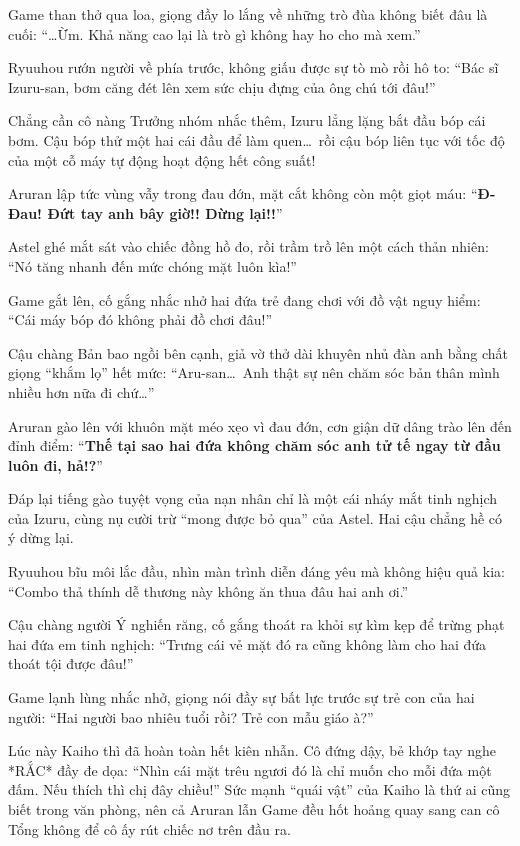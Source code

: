 \documentclass[../main.tex]{subfiles}
\begin{document}
Game than thở qua loa, giọng đầy lo lắng về những trò đùa không biết đâu là cuối: ``\dots Ừm. Khả năng cao lại là trò gì không hay ho cho mà xem.''

Ryuuhou rướn người về phía trước, không giấu được sự tò mò rồi hô to: ``Bác sĩ Izuru-san, bơm căng đét lên xem sức chịu đựng của ông chú tới đâu!''

Chẳng cần cô nàng Trưởng nhóm nhắc thêm, Izuru lẳng lặng bắt đầu bóp cái bơm. Cậu bóp thử một hai cái đầu để làm quen\dots\ rồi cậu bóp liên tục với tốc độ của một cỗ máy tự động hoạt động hết công suất!

Aruran lập tức vùng vẫy trong đau đớn, mặt cắt không còn một giọt máu: ``\textbf{Đ-Đau! Đứt tay anh bây giờ!! Dừng lại!!}''


Astel ghé mắt sát vào chiếc đồng hồ đo, rồi trầm trồ lên một cách thản nhiên: ``Nó tăng nhanh đến mức chóng mặt luôn kìa!''

Game gắt lên, cố gắng nhắc nhở hai đứa trẻ đang chơi với đồ vật nguy hiểm: ``Cái máy bóp đó không phải đồ chơi đâu!''

Cậu chàng Bản bao ngồi bên cạnh, giả vờ thở dài khuyên nhủ đàn anh bằng chất giọng ``khắm lọ'' hết mức: ``Aru-san\dots\ Anh thật sự nên chăm sóc bản thân mình nhiều hơn nữa đi chứ\dots''

Aruran gào lên với khuôn mặt méo xẹo vì đau đớn, cơn giận dữ dâng trào lên đến đỉnh điểm: ``\textbf{Thế tại sao hai đứa không chăm sóc anh tử tế ngay từ đầu luôn đi, hả!?}''

Đáp lại tiếng gào tuyệt vọng của nạn nhân chỉ là một cái nháy mắt tinh nghịch của Izuru, cùng nụ cười trừ ``mong được bỏ qua'' của Astel. Hai cậu chẳng hề có ý dừng lại.


Ryuuhou bĩu môi lắc đầu, nhìn màn trình diễn đáng yêu mà không hiệu quả kia: ``Combo thả thính dễ thương này không ăn thua đâu hai anh ơi.''

Cậu chàng người Ý nghiến răng, cố gắng thoát ra khỏi sự kìm kẹp để trừng phạt hai đứa em tinh nghịch: ``Trưng cái vẻ mặt đó ra cũng không làm cho hai đứa thoát tội được đâu!''

Game lạnh lùng nhắc nhở, giọng nói đầy sự bất lực trước sự trẻ con của hai người: ``Hai người bao nhiêu tuổi rồi? Trẻ con mẫu giáo à?''

Lúc này Kaiho thì đã hoàn toàn hết kiên nhẫn. Cô đứng dậy, bẻ khớp tay nghe *RẮC* đầy đe dọa: ``Nhìn cái mặt trêu ngươi đó là chỉ muốn cho mỗi đứa một đấm. Nếu thích thì chị đây chiều!'' Sức mạnh ``quái vật'' của Kaiho là thứ ai cũng biết trong văn phòng, nên cả Aruran lẫn Game đều hốt hoảng quay sang can cô Tổng không để cô ấy rút chiếc nơ trên đầu ra.
\end{document}
